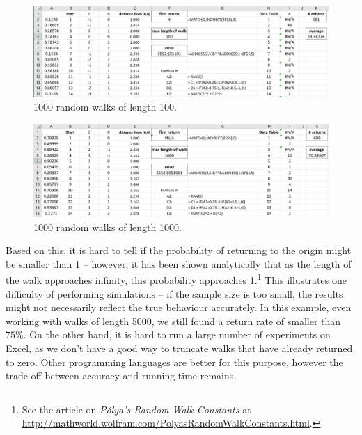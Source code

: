 \begin{figure}[h]
	\centering
	\includegraphics[width=\textwidth]{fig/3_random2D_3.png}
	\caption{1000 random walks of length 100. \label{fig:3_random2D_3}}
\end{figure}

\vspace{0.5cm}

\begin{figure}[h]
	\centering
	\includegraphics[width=\textwidth]{fig/3_random2D_4.png}
	\caption{1000 random walks of length 1000. \label{fig:3_random2D_4}}
\end{figure}

Based on this, it is hard to tell if the probability of returning to the origin might be smaller than 1 -- however, it has been shown analytically that as the length of the walk approaches infinity, this probability approaches 1.\footnote{See the article on \emph{P\'olya's Random Walk Constants} at \\ \url{http://mathworld.wolfram.com/PolyasRandomWalkConstants.html}.}
This illustrates one difficulty of performing simulations -- if the sample size is too small, the results might not necessarily reflect the true behaviour accurately.
In this example, even working with walks of length 5000, we still found a return rate of smaller than $75\%$.
On the other hand, it is hard to run a large number of experiments on Excel, as we don't have a good way to truncate walks that have already returned to zero.
Other programming languages are better for this purpose, however the trade-off between accuracy and running time remains.

\vspace{1cm}

